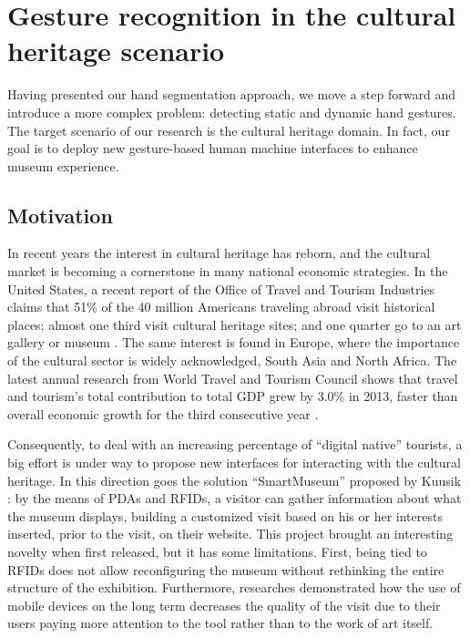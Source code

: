 
\chapter{Gesture recognition in the cultural heritage scenario}


Having presented our hand segmentation approach, we move a step forward and introduce a more complex problem: detecting static and dynamic hand gestures. The target scenario of our research is the cultural heritage domain. In fact, our goal is to deploy new gesture-based human machine interfaces to enhance museum experience.

\section{Motivation}
In recent years the interest in cultural heritage has reborn, and the cultural market is becoming a cornerstone in many national economic strategies. In the United States, a recent report of the Office of Travel and Tourism Industries claims that 51\% of the 40 million Americans traveling abroad visit historical places; almost one third visit cultural heritage sites; and one quarter go to an art gallery or museum \cite{tourismintelligence}. The same interest is found in Europe, where the importance of the cultural sector is widely acknowledged, South Asia and North Africa. The latest annual research from World Travel and Tourism Council shows that travel and tourism's total contribution to total GDP grew by 3.0\% in 2013, faster than overall economic growth for the third consecutive year \cite{econotravel}.

Consequently, to deal with an increasing percentage of ``digital native'' tourists, a big effort is under way to propose new interfaces for interacting with the cultural heritage.
 In this direction goes the solution ``SmartMuseum'' proposed by Kuusik \etal \cite{kuusik2009smartmuseum}: by the means of PDAs and RFIDs, a visitor can gather information about what the museum displays, building a customized visit based on his or her interests inserted, prior to the visit, on their website. This project brought an interesting novelty when first released, but it has some limitations. First, being tied to RFIDs does not allow reconfiguring the museum without rethinking the entire structure of the exhibition. Furthermore, researches demonstrated how the use of mobile devices on the long term decreases the quality of the visit due to their users paying more attention to the tool rather than to the work of art itself.

